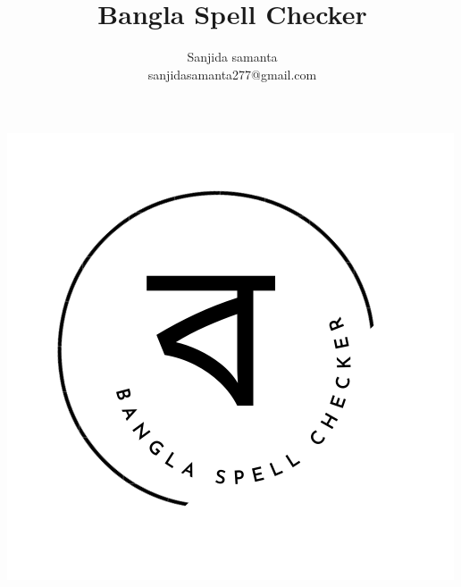 \documentclass[12pt,letterpaper]{article}
\title{Bangla Spell Checker}
\author{Sanjida samanta\\sanjidasamanta277@gmail.com}
\begin{document}
\maketitle
\centering
\vspace{6cm}
\includegraphics[scale=0.5]{bsc.png}
\clearpage
\tableofcontents
\clearpage
\end{document}
